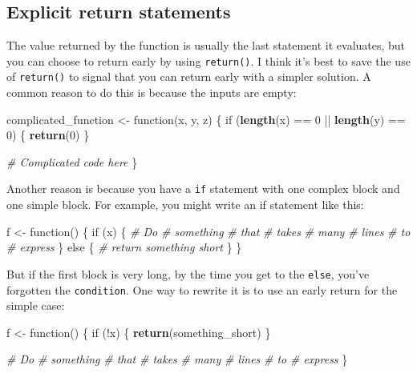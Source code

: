 \documentclass[]{book}
\newenvironment{Shaded}{\begin{snugshade}}{\end{snugshade}}
\newcommand{\KeywordTok}[1]{\textcolor[rgb]{0.13,0.29,0.53}{\textbf{{#1}}}}
\newcommand{\DecValTok}[1]{\textcolor[rgb]{0.00,0.00,0.81}{{#1}}}
\newcommand{\StringTok}[1]{\textcolor[rgb]{0.31,0.60,0.02}{{#1}}}
\newcommand{\CommentTok}[1]{\textcolor[rgb]{0.56,0.35,0.01}{\textit{{#1}}}}
\newcommand{\NormalTok}[1]{{#1}}
\begin{document}
\subsection{Explicit return
statements}\label{explicit-return-statements}

The value returned by the function is usually the last statement it
evaluates, but you can choose to return early by using
\texttt{return()}. I think it's best to save the use of
\texttt{return()} to signal that you can return early with a simpler
solution. A common reason to do this is because the inputs are empty:

\begin{Shaded}
\begin{Highlighting}[]
\NormalTok{complicated_function <-}\StringTok{ }\NormalTok{function(x, y, z) \{}
  \NormalTok{if (}\KeywordTok{length}\NormalTok{(x) ==}\StringTok{ }\DecValTok{0} \NormalTok{||}\StringTok{ }\KeywordTok{length}\NormalTok{(y) ==}\StringTok{ }\DecValTok{0}\NormalTok{) \{}
    \KeywordTok{return}\NormalTok{(}\DecValTok{0}\NormalTok{)}
  \NormalTok{\}}
    
  \CommentTok{# Complicated code here}
\NormalTok{\}}
\end{Highlighting}
\end{Shaded}

Another reason is because you have a \texttt{if} statement with one
complex block and one simple block. For example, you might write an if
statement like this:

\begin{Shaded}
\begin{Highlighting}[]
\NormalTok{f <-}\StringTok{ }\NormalTok{function() \{}
  \NormalTok{if (x) \{}
    \CommentTok{# Do }
    \CommentTok{# something}
    \CommentTok{# that}
    \CommentTok{# takes}
    \CommentTok{# many}
    \CommentTok{# lines}
    \CommentTok{# to}
    \CommentTok{# express}
  \NormalTok{\} else \{}
    \CommentTok{# return something short}
  \NormalTok{\}}
\NormalTok{\}}
\end{Highlighting}
\end{Shaded}

But if the first block is very long, by the time you get to the
\texttt{else}, you've forgotten the \texttt{condition}. One way to
rewrite it is to use an early return for the simple case:

\begin{Shaded}
\begin{Highlighting}[]

\NormalTok{f <-}\StringTok{ }\NormalTok{function() \{}
  \NormalTok{if (!x) \{}
    \KeywordTok{return}\NormalTok{(something_short)}
  \NormalTok{\}}

  \CommentTok{# Do }
  \CommentTok{# something}
  \CommentTok{# that}
  \CommentTok{# takes}
  \CommentTok{# many}
  \CommentTok{# lines}
  \CommentTok{# to}
  \CommentTok{# express}
\NormalTok{\}}
\end{Highlighting}
\end{Shaded}
\end{document}
